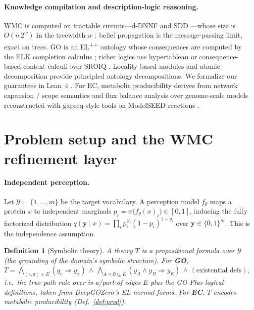 \documentclass[11pt]{article}
\newtheorem{definition}{Definition}
\newcommand{\bC}[1]{\boldsymbol{#1}}
\begin{document}
\paragraph{Knowledge compilation and description-logic reasoning.}
WMC is computed on tractable circuits---d-DNNF and SDD
\citep{darwiche2002factoring,darwiche2011sdd,chavira2008wmc}---whose size is $O(n\,2^{w})$ in the
treewidth $w$ \citep{darwiche2002kcmap,bodlaender1993treewidth}; belief propagation
\citep{pearl1988probabilistic} is the message-passing limit, exact on trees. GO is an
EL\textsuperscript{++} ontology \citep{baader2005elenvelope} whose consequences are computed by
the ELK completion calculus \citep{kazakov2014elk}; richer logics use hypertableau
\citep{motik2009hypertableau} or consequence-based context calculi
\citep{bate2016sriq,tenacucala2019sequoia} over SROIQ \citep{horrocks2006sroiq}. Locality-based
modules \citep{cuencagrau2008modular} and atomic decomposition \citep{delvescovo2011atomic}
provide principled ontology decompositions. We formalize our guarantees in Lean~4
\citep{demoura2021lean,mathlib2020}. For EC, metabolic producibility derives from network
expansion / scope semantics \citep{ebenhoeh2004scope} and flux balance analysis
\citep{orth2010fba} over genome-scale models reconstructed with gapseq-style tools
\citep{zimmermann2021gapseq} on ModelSEED reactions \citep{henry2010modelseed}.

\section{Problem setup and the WMC refinement layer}\label{sec:method}
\paragraph{Independent perception.}
Let $\mathcal{Y}=\{1,\dots,m\}$ be the target vocabulary. A perception model $f_\theta$ maps a
protein $x$ to independent marginals $p_i=\sigma\!\big(f_\theta(x)_i\big)\in[0,1]$, inducing the
fully factorized distribution
$q(\bC y\mid x)=\prod_{i}p_i^{\,y_i}(1-p_i)^{1-y_i}$ over $\bC y\in\{0,1\}^m$. This is the
independence assumption.

\begin{definition}[Symbolic theory]
A theory $T$ is a propositional formula over $\mathcal Y$ (the grounding of the domain's symbolic
structure). For \textbf{GO}, $T=\bigwedge_{(c,\pi)\in E}(y_c\!\Rightarrow\!y_\pi)\,\wedge\,
\bigwedge_{A\sqcap B\sqsubseteq E}(y_A\wedge y_B\!\Rightarrow\!y_E)\,\wedge\,(\text{existential
defs})$, i.e.\ the true-path rule over is-a/part-of edges $E$ plus the GO-Plus logical
definitions, taken from DeepGOZero's EL normal forms. For \textbf{EC}, $T$ encodes metabolic
producibility (Def.~\ref{def:prod}).
\end{definition}
\end{document}
